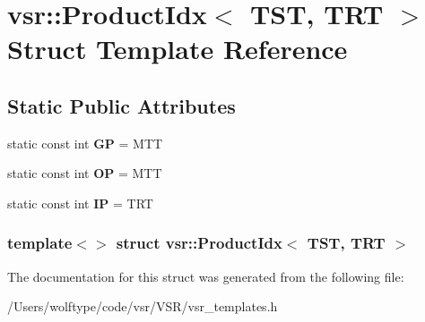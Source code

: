 \hypertarget{structvsr_1_1_product_idx_3_01_t_s_t_00_01_t_r_t_01_4}{\section{vsr\-:\-:Product\-Idx$<$ T\-S\-T, T\-R\-T $>$ Struct Template Reference}
\label{structvsr_1_1_product_idx_3_01_t_s_t_00_01_t_r_t_01_4}
}
\subsection*{Static Public Attributes}
\begin{DoxyCompactItemize}
\item 
\hypertarget{structvsr_1_1_product_idx_3_01_t_s_t_00_01_t_r_t_01_4_a6beb161ea7c540cedc3331e482ec870d}{static const int {\bfseries G\-P} = M\-T\-T}\label{structvsr_1_1_product_idx_3_01_t_s_t_00_01_t_r_t_01_4_a6beb161ea7c540cedc3331e482ec870d}

\item 
\hypertarget{structvsr_1_1_product_idx_3_01_t_s_t_00_01_t_r_t_01_4_ac95b710287a93ef912a76bde4a06fdb3}{static const int {\bfseries O\-P} = M\-T\-T}\label{structvsr_1_1_product_idx_3_01_t_s_t_00_01_t_r_t_01_4_ac95b710287a93ef912a76bde4a06fdb3}

\item 
\hypertarget{structvsr_1_1_product_idx_3_01_t_s_t_00_01_t_r_t_01_4_addcbaa3b1b9efd5eaea36b04b352b1c4}{static const int {\bfseries I\-P} = T\-R\-T}\label{structvsr_1_1_product_idx_3_01_t_s_t_00_01_t_r_t_01_4_addcbaa3b1b9efd5eaea36b04b352b1c4}

\end{DoxyCompactItemize}
\subsubsection*{template$<$$>$ struct vsr\-::\-Product\-Idx$<$ T\-S\-T, T\-R\-T $>$}



The documentation for this struct was generated from the following file\-:\begin{DoxyCompactItemize}
\item 
/\-Users/wolftype/code/vsr/\-V\-S\-R/vsr\-\_\-templates.\-h\end{DoxyCompactItemize}
